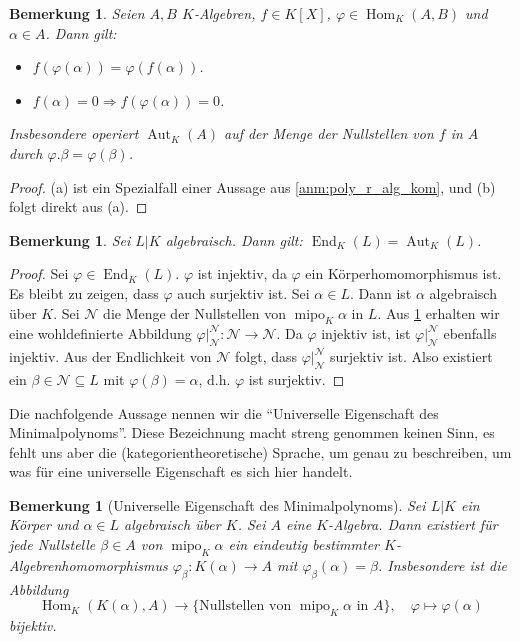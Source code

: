 \documentclass[a4paper, twoside, 11pt, ngerman]{report}
\newcommand{\calN}{\mathcal N}
\DeclareMathOperator{\Aut}{Aut}
\DeclareMathOperator{\End}{End}
\DeclareMathOperator{\Hom}{Hom}
\DeclareMathOperator{\mipo}{mipo}
\theoremstyle{definistyle}
\newtheorem{bem}[satz]{Bemerkung}
\theoremstyle{remark}
\begin{document}
\begin{bem}\label{bem:k-algebra_homomorphismen}
Seien $A, B$ $K$-Algebren, $f \in K[X]$, $\varphi \in \Hom_K(A, B)$ und $\alpha \in A$. Dann gilt:
\begin{itemize}
    \item[(a)] $f(\varphi(\alpha)) = \varphi(f(\alpha))$.
    \item[(b)] $f(\alpha) = 0 \Rightarrow f(\varphi(\alpha)) = 0$.
\end{itemize}
Insbesondere operiert $\Aut_K(A)$ auf der Menge der Nullstellen von $f$ in $A$ durch $\varphi.\beta=\varphi(\beta)$.
\end{bem}

\begin{proof}
(a) ist ein Spezialfall einer Aussage aus \ref{anm:poly_r_alg_kom}, und (b) folgt direkt aus (a).
\end{proof}

\begin{bem}\label{bem:end_ist_aut}
Sei $L|K$ algebraisch. Dann gilt: $\End_K(L) = \Aut_K(L)$.
\end{bem}

\begin{proof}
Sei $\varphi \in \End_K(L)$. $\varphi$ ist injektiv, da $\varphi$ ein Körperhomomorphismus ist. Es bleibt zu zeigen, dass $\varphi$ auch surjektiv ist. Sei $\alpha \in L$. Dann ist $\alpha$ algebraisch über $K$. Sei $\mathcal{N}$ die Menge der Nullstellen von $\mipo_K \alpha$ in $L$. Aus \ref{bem:k-algebra_homomorphismen} erhalten wir eine wohldefinierte Abbildung $\varphi|_{\mathcal{N}}^\mathcal{N} \colon \mathcal{N} \to \mathcal{N}$. Da $\varphi$ injektiv ist, ist $\varphi|_{\mathcal{N}}^\calN$ ebenfalls injektiv. Aus der Endlichkeit von $\mathcal{N}$ folgt, dass $\varphi|_{\mathcal{N}}^\mathcal{N}$ surjektiv ist. Also existiert ein $\beta \in \mathcal{N}\subseteq L$ mit $\varphi(\beta) = \alpha$, d.h. $\varphi$ ist surjektiv.
\end{proof}

Die nachfolgende Aussage nennen wir die "`Universelle Eigenschaft des Minimalpolynoms"'.
Diese Bezeichnung macht streng genommen keinen Sinn, es fehlt uns aber die (kategorientheoretische) Sprache, um genau zu beschreiben, um was für eine universelle Eigenschaft es sich hier handelt.

\begin{bem}[Universelle Eigenschaft des Minimalpolynoms]\label{bem:minimalpolynom_universelle_eigenschaft}
Sei $L|K$ ein Körper und $\alpha \in L$ algebraisch über $K$. Sei $A$ eine $K$-Algebra. Dann existiert für jede Nullstelle $\beta \in A$ von $\mipo_K \alpha$ ein eindeutig bestimmter $K$-Algebrenhomomorphismus $\varphi_\beta \colon K(\alpha) \to A$ mit $\varphi_\beta(\alpha) = \beta$. Insbesondere ist die Abbildung
\[
\Hom_K(K(\alpha), A) \to \{\text{Nullstellen von } \mipo_K \alpha \text{ in } A\}, \quad \varphi \mapsto \varphi(\alpha)
\]
bijektiv.
\end{bem}
\end{document}
